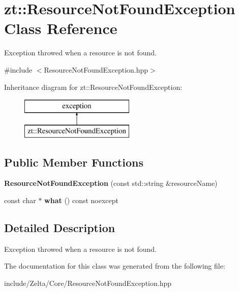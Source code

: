 \hypertarget{classzt_1_1_resource_not_found_exception}{}\section{zt\+:\+:Resource\+Not\+Found\+Exception Class Reference}
\label{classzt_1_1_resource_not_found_exception}


Exception throwed when a resource is not found.  




{\ttfamily \#include $<$Resource\+Not\+Found\+Exception.\+hpp$>$}

Inheritance diagram for zt\+:\+:Resource\+Not\+Found\+Exception\+:\begin{figure}[H]
\begin{center}
\leavevmode
\includegraphics[height=2.000000cm]{classzt_1_1_resource_not_found_exception}
\end{center}
\end{figure}
\subsection*{Public Member Functions}
\begin{DoxyCompactItemize}
\item 
\mbox{\label{classzt_1_1_resource_not_found_exception_a3ee4e4b82f9c315f7ab9407905556cc4}} 
{\bfseries Resource\+Not\+Found\+Exception} (const std\+::string \&resource\+Name)
\item 
\mbox{\label{classzt_1_1_resource_not_found_exception_a2cebe772d62daef314041f9ab21d13dd}} 
const char $\ast$ {\bfseries what} () const noexcept
\end{DoxyCompactItemize}


\subsection{Detailed Description}
Exception throwed when a resource is not found. 

The documentation for this class was generated from the following file\+:\begin{DoxyCompactItemize}
\item 
include/\+Zelta/\+Core/Resource\+Not\+Found\+Exception.\+hpp\end{DoxyCompactItemize}
